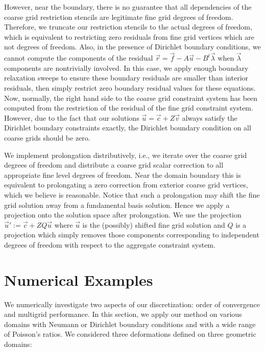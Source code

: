 However, near the boundary, there is no guarantee that all dependencies of the coarse grid restriction stencils are legitimate fine grid degrees of freedom. Therefore, we truncate our restriction stencils to the actual degrees of freedom, which is equivalent to restricting zero residuals from fine grid vertices which are not degrees of freedom. Also, in the presence of Dirichlet boundary conditions, we cannot compute the components of the residual $\vec{r} = \vec{f} - A \vec{u} - B^t \vec{\lambda}$ when $\vec{\lambda}$ components are nontrivially involved. In this case, we apply enough boundary relaxation sweeps to ensure these boundary residuals are smaller than interior residuals, then simply restrict zero boundary residual values for these equations. Now, normally, the right hand side to the coarse grid constraint system has been computed from the restriction of the residual of the fine grid constraint system. However, due to the fact that our solutions $\vec{u} = \vec{c} + Z \vec{v}$ always satisfy the Dirichlet boundary constraints exactly, the Dirichlet boundary condition on all coarse grids should be zero.

We implement prolongation distributively, i.e., we iterate over the coarse grid degrees of freedom and distribute a coarse grid scalar correction to all appropriate fine level degrees of freedom. Near the domain boundary this is equivalent to prolongating a zero correction from exterior coarse grid vertices, which we believe is reasonable. Notice that such a prolongation may shift the fine grid solution away from a fundamental basis solution. Hence we apply a projection onto the solution space after prolongation. We use the projection $\vec{u}' := \vec{c} + Z Q \vec{u}$ where $\vec{u}$ is the (possibly) shifted fine grid solution and $Q$ is a projection which simply removes those components corresponding to independent degrees of freedom with respect to the aggregate constraint system.

\section{Numerical Examples} \label{sec:ch5.examples}

We numerically investigate two aspects of our discretization: order of convergence and multigrid performance. In this section, we apply our method on various domains with Neumann or Dirichlet boundary conditions and with a wide range of Poisson's ratios. We considered three deformations defined on three geometric domains:

